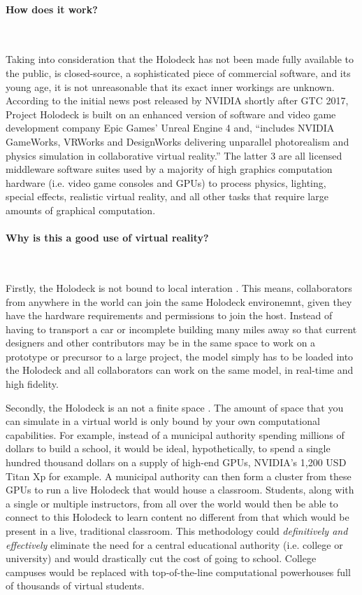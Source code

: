 \documentclass[11pt]{article}
\begin{document}
\paragraph{How does it work?} ~ \par 
Taking into consideration that the Holodeck has not been made fully available to the public, is closed-source, a sophisticated piece of commercial software, and its young age, it is not unreasonable that its exact inner workings are unknown. According to the initial news post released by NVIDIA shortly after GTC 2017, \cite{nvidiablog1} Project Holodeck is built on an enhanced version of software and video game development company Epic Games' Unreal Engine 4 and, ``includes NVIDIA GameWorks, VRWorks and DesignWorks delivering unparallel photorealism and physics simulation in collaborative virtual reality.'' The latter 3 are all licensed middleware software suites used by a majority of high graphics computation hardware (i.e. video game consoles and GPUs) to process physics, lighting, special effects, realistic virtual reality, and all other tasks that require large amounts of graphical computation.

\paragraph{Why is this a good use of virtual reality?} ~ \par 
Firstly, the Holodeck is not bound to local interation \cite{nvidiablog2}. This means, collaborators from anywhere in the world can join the same Holodeck environemnt, given they have the hardware requirements and permissions to join the host. Instead of having to transport a car or incomplete building many miles away so that current designers and other contributors may be in the same space to work on a prototype or precursor to a large project, the model simply has to be loaded into the Holodeck and all collaborators can work on the same model, in real-time and high fidelity. 

Secondly, the Holodeck is an not a finite space \cite{nvidiablog2}. The amount of space that you can simulate in a virtual world is only bound by your own computational capabilities. For example, instead of a municipal authority spending millions of dollars to build a school, it would be ideal, hypothetically, to spend a single hundred thousand dollars on a supply of high-end GPUs, NVIDIA's 1,200 USD Titan Xp for example. A municipal authority can then form a cluster from these GPUs to run a live Holodeck that would house a classroom. Students, along with a single or multiple instructors, from all over the world would then be able to connect to this Holodeck to learn content no different from that which would be present in a live, traditional classroom. This methodology could \emph{definitively and effectively} eliminate the need for a central educational authority (i.e. college or university) and would drastically cut the cost of going to school. College campuses would be replaced with top-of-the-line computational powerhouses full of thousands of virtual students.
\end{document}
